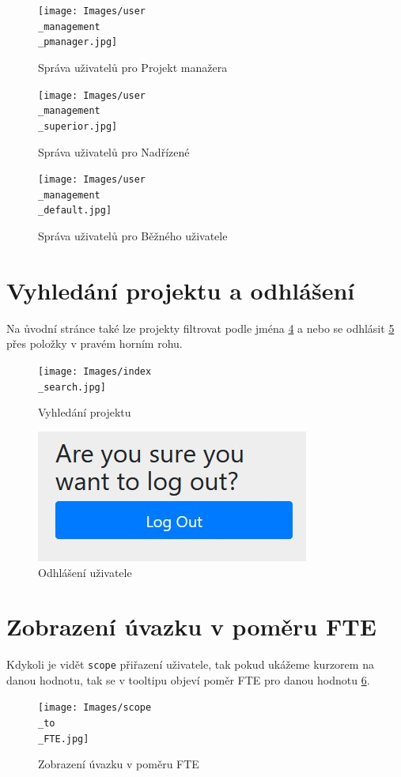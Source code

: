 \documentclass[czech,P5]{thesiskiv}
\begin{document}
 \begin{figure}[H]
	\centering
	\texttt{[image: Images/user\\\_management\\\_pmanager.jpg]}
	\caption{Správa uživatelů pro Projekt manažera}
	\label{fig:userManPMan} 
\end{figure}
 \begin{figure}[H]
	\centering
	\texttt{[image: Images/user\\\_management\\\_superior.jpg]}
	\caption{Správa uživatelů pro Nadřízené}
	\label{fig:userManSup} 
\end{figure}
 \begin{figure}[H]
	\centering
	\texttt{[image: Images/user\\\_management\\\_default.jpg]}
	\caption{Správa uživatelů pro Běžného uživatele}
	\label{fig:userManDef} 
\end{figure}
\newpage

\section{Vyhledání projektu a odhlášení}
Na ůvodní stránce také lze projekty filtrovat podle jména \ref{fig:searchProject}  a nebo se odhlásit \ref{fig:logout} přes položky v pravém horním rohu.
 \begin{figure}[H]
	\centering
	\texttt{[image: Images/index\\\_search.jpg]}
	\caption{Vyhledání projektu}
	\label{fig:searchProject} 
\end{figure}
 \begin{figure}[H]
	\centering
	\includegraphics{Images/logout.jpg}
	\caption{Odhlášení uživatele}
	\label{fig:logout} 
\end{figure}

\section{Zobrazení úvazku v poměru FTE}
Kdykoli je vidět \texttt{scope} přiřazení uživatele, tak pokud ukážeme kurzorem na danou hodnotu, tak se v tooltipu objeví poměr FTE pro danou hodnotu \ref{fig:FTE}.
 \begin{figure}[H]
	\centering
	\texttt{[image: Images/scope\\\_to\\\_FTE.jpg]}
	\caption{Zobrazení úvazku v poměru FTE}
	\label{fig:FTE} 
\end{figure}
\end{document}
